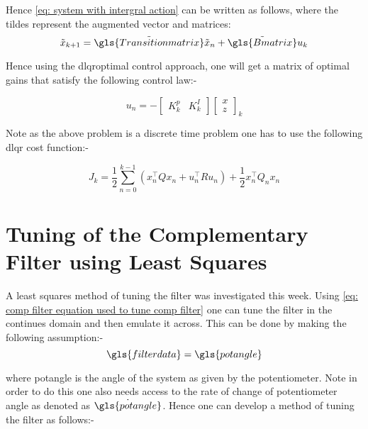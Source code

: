 Hence \eqref{eq: system with intergral action} can be written as follows, where the tildes represent the augmented vector and matrices:
 \begin{equation}
 \tilde{x}_{k+1} = \tilde{\gls{Transitionmatrix}}\tilde{x}_n + \tilde{\gls{Bmatrix}}u_k
 \end{equation}
 
 Hence using the \gls{dlqr}optimal control approach, one will get a matrix of optimal gains that satisfy the following control law:- 
 
 \begin{equation}
 u_n = - \left[\begin{array}{cc}
 K_k^p &K_k^I 
 \end{array}\right]\left[\begin{array}{c} x\\ z\end{array}\right]_{k} 
 \end{equation}
 
 Note as the above problem is a discrete time problem one has to use the following \gls{dlqr} cost function:-
 
 \begin{equation}
 J_k  = \frac{1}{2} \sum_{n=0}^{k-1}(x_n^\intercal Q x_n + u_n^\intercal Ru_n) + \frac{1}{2}x_n^\intercal Q_n x_n
 \end{equation}
 
  \tocless\section{Tuning of the Complementary Filter using Least Squares }
 A least squares method of tuning the filter was investigated this week. Using \eqref{eq: comp filter equation used to tune comp filter} one can tune the filter in the continues domain and then emulate it across. This can be done by making the following assumption:-
 \begin{equation}
 \gls{filterdata} = \gls{potangle}
 \end{equation} 
 
 where \gls{potangle} is the angle of the system as given by the potentiometer. Note in order to do this one also needs access to the rate of change of potentiometer angle as denoted as $\dot{\gls{potangle}}$. Hence one can develop a method of tuning the filter as follows:-
 
 
 
